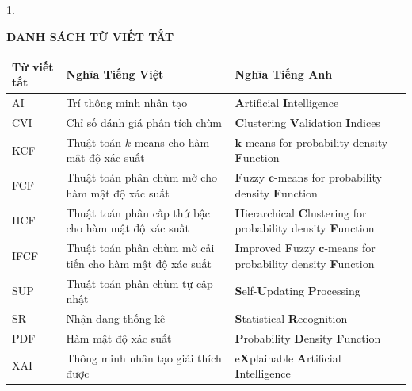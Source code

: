 \documentclass[a4paper,oneside]{book} %
\theoremstyle{plain}
\theoremstyle{plain}
\theoremstyle{nonumberplain}
\begin{document}
{\begin{spacing}{1.}
\newpage
\vspace*{50pt} %
\begin{center}
	{\fontsize{14}{0pt}\selectfont\bf DANH SÁCH TỪ VIẾT TẮT}
\end{center}
\vspace{20pt}  %



\begin{table}[H]
	\centering
	\begin{tabular*}{\columnwidth}{@{\extracolsep\fill}lp{6cm}p{6cm}@{\extracolsep\fill}} 
		\toprule
		\bf Từ viết tắt & \bf Nghĩa Tiếng Việt & \bf  Nghĩa Tiếng Anh \\ \midrule
		AI & Trí thông minh nhân tạo & \textbf{A}rtificial \textbf{I}ntelligence \\
		CVI & Chỉ số đánh giá phân tích chùm & \textbf{C}lustering \textbf{V}alidation \textbf{I}ndices \\
		KCF & Thuật toán $k$-means cho hàm mật độ xác suất & $\bm k$-means for probability density \textbf{F}unction \\
		FCF & Thuật toán phân chùm mờ cho hàm mật độ xác suất & \textbf{F}uzzy $\bm c$-means for probability density \textbf{F}unction \\
		HCF & Thuật toán phân cấp thứ bậc cho hàm mật độ xác suất & \textbf{H}ierarchical \textbf{C}lustering for probability density \textbf{F}unction \\
		IFCF & Thuật toán phân chùm mờ cải tiến cho hàm mật độ xác suất & \textbf{I}mproved \textbf{F}uzzy $\bm c$-means for probability density \textbf{F}unction \\
		SUP & Thuật toán phân chùm tự cập nhật & \textbf{S}elf-\textbf{U}pdating \textbf{P}rocessing \\
		SR & Nhận dạng thống kê & \textbf{S}tatistical \textbf{R}ecognition\\
		PDF & Hàm mật độ xác suất & \textbf{P}robability \textbf{D}ensity \textbf{F}unction\\
		XAI & Thông minh nhân tạo giải thích được & e\textbf{X}plainable \textbf{A}rtificial \textbf{I}ntelligence \\
		\bottomrule
	\end{tabular*}
\end{table}

\end{spacing}
}
\end{document}
